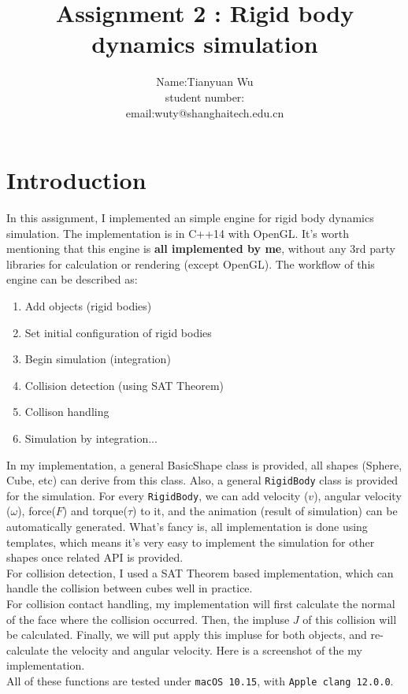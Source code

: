 \documentclass[acmtog]{acmart}
\title{Assignment 2 : Rigid body dynamics simulation}
\author{Name:\quad Tianyuan Wu  \\ student number:\quad 63305667
	\\email:\quad wuty@shanghaitech.edu.cn}
\begin{document}
\maketitle

\vspace*{2 ex}


\section{Introduction}
	In this assignment, I implemented an simple engine for rigid body dynamics simulation.
	The implementation is in C++14 with OpenGL. It's worth mentioning that this engine is \textbf{all implemented 
	by me}, without any 3rd party libraries for calculation or rendering (except OpenGL). The workflow of this engine can 
	be described as:
	\begin{enumerate}
		\item Add objects (rigid bodies)
		\item Set initial configuration of rigid bodies
		\item Begin simulation (integration)
		\item Collision detection (using SAT Theorem)
		\item Collison handling 
		\item Simulation by integration...
	\end{enumerate}
	In my implementation, a general BasicShape class is provided, all shapes (Sphere, Cube, etc) 
	can derive from this class. Also, a general \texttt{RigidBody} class is provided for the simulation.
	For every \texttt{RigidBody}, we can add velocity ($v$), angular velocity ($\omega$), force($F$) and torque($\tau$) to it, 
	and the animation (result of simulation) can be automatically generated. What's fancy is, all implementation
	is done using templates, which means it's very easy to implement the simulation for other shapes once 
	related API is provided.\\
	For collision detection, I used a SAT Theorem based implementation, which can handle the collision
	between cubes well in practice.\\
	For collision contact handling, my implementation will first calculate the normal of the face where the collision
	occurred. Then, the impluse $J$ of this collision will be calculated. Finally, we will put apply this 
	impluse for both objects, and re-calculate the velocity and angular velocity.
	Here is a screenshot of the my implementation.\\
	All of these functions are tested under \texttt{macOS 10.15}, with \texttt{Apple clang 12.0.0}.
\end{document}
